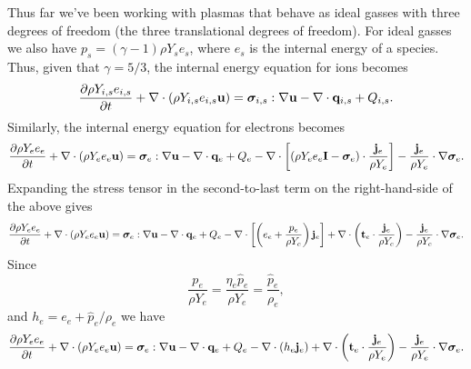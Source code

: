 \documentclass[a4paper,11pt]{report}
\begin{document}
Thus far we've been working with plasmas that behave as ideal gasses with three degrees of freedom (the three translational degrees of freedom). For ideal gasses we also have $p_s = (\gamma - 1) \rho Y_s e_s$, where $e_s$ is the internal energy of a species. Thus, given that $\gamma = 5/3$, the internal energy equation for ions becomes
\begin{equation*}
    \frac{\partial \rho Y_{i,s} e_{i,s}}{\partial t} + \nabla \cdot \left( \rho Y_{i,s} e_{i,s} \mathbf{u} \right) = \bm \sigma_{i,s} : \nabla \mathbf{u} - \nabla \cdot \mathbf{q}_{i,s} + Q_{i,s}.
\end{equation*}
Similarly, the internal energy equation for electrons becomes
\begin{equation*}
    \frac{\partial \rho Y_e e_e}{\partial t} + \nabla \cdot \left( \rho Y_e e_e \mathbf{u} \right) = \bm \sigma_e : \nabla \mathbf{u} - \nabla \cdot \mathbf{q}_e + Q_e - \nabla \cdot \left[ \left( \rho Y_e e_e \mathbf{I} - \bm \sigma_e \right) \cdot \frac{\mathbf{j}_e}{\rho Y_e}  \right] - \frac{\mathbf{j}_e}{\rho Y_e} \cdot \nabla \bm \sigma_e.
\end{equation*}
Expanding the stress tensor in the second-to-last term on the right-hand-side of the above gives
\begin{equation*}
    \frac{\partial \rho Y_e e_e}{\partial t} + \nabla \cdot \left( \rho Y_e e_e \mathbf{u} \right) = \bm \sigma_e : \nabla \mathbf{u} - \nabla \cdot \mathbf{q}_e + Q_e -\nabla \cdot \left[ \left( e_e + \frac{p_e}{\rho Y_e} \right) \mathbf{j}_e \right] + \nabla \cdot \left( \mathbf{t}_e \cdot \frac{\mathbf{j}_e}{\rho Y_e}  \right) - \frac{\mathbf{j}_e}{\rho Y_e} \cdot \nabla \bm \sigma_e.
\end{equation*}
Since
\begin{equation*}
    \frac{p_e}{\rho Y_e} = \frac{\eta_e \hat{p}_e}{\rho Y_e} = \frac{\hat{p}_e}{\rho_e},
\end{equation*}
and $h_e = e_e + \hat{p}_e / \rho_e$ we have 
\begin{equation*}
    \frac{\partial \rho Y_e e_e}{\partial t} + \nabla \cdot \left( \rho Y_e e_e \mathbf{u} \right) = \bm \sigma_e : \nabla \mathbf{u} - \nabla \cdot \mathbf{q}_e + Q_e -\nabla \cdot \left( h_e \mathbf{j}_e \right) + \nabla \cdot \left( \mathbf{t}_e \cdot \frac{\mathbf{j}_e}{\rho Y_e}  \right) - \frac{\mathbf{j}_e}{\rho Y_e} \cdot \nabla \bm \sigma_e.
\end{equation*}
\end{document}
